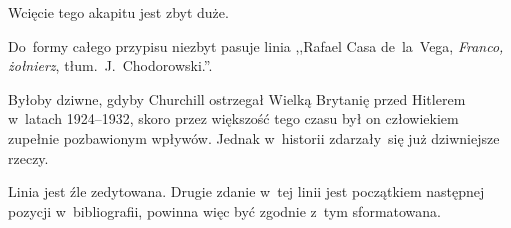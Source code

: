\documentclass[a4paper,11pt]{article}
\begin{document}
\start {} Wcięcie tego akapitu jest zbyt duże.

\vspace{\spaceFour}


\start {} Do~formy całego przypisu niezbyt pasuje linia
,,Rafael Casa de~la~Vega, \emph{Franco, żołnierz},
tłum.~J.~Chodorowski.''.

\vspace{\spaceFour}


\start {} Byłoby dziwne, gdyby Churchill ostrzegał Wielką
Brytanię przed Hitlerem w~latach 1924--1932, skoro przez większość
tego czasu był on człowiekiem zupełnie pozbawionym wpływów. Jednak
w~historii zdarzały~się już dziwniejsze rzeczy.

\vspace{\spaceFour}


\start {} Linia jest źle zedytowana. Drugie zdanie w~tej
linii jest początkiem następnej pozycji w~bibliografii, powinna więc
być zgodnie z~tym sformatowana.

\vspace{\spaceFour}
\end{document}
